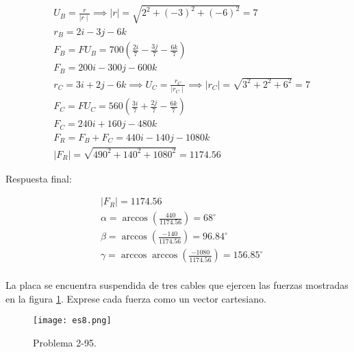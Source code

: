 \begin{align*}
	 & U_B=\frac{r}{\mid r\mid}\implies \mid r\mid=\sqrt{2^2+(-3)^2+(-6)^2}=7                        \\
	 & r_B=2i-3j-6k                                                                                  \\
	 & F_B=FU_B=700\left( \frac{2i}{7}-\frac{3j}{7}-\frac{6k}{7} \right)                             \\
	 & F_B=200i-300j-600k                                                                            \\
	 & r_C=3i+2j-6k\implies U_C=\frac{r_C}{\mid r_C \mid}\implies \mid r_C \mid=\sqrt{3^2+2^2+6^2}=7 \\
	 & F_C=FU_C=560\left( \frac{3i}{7}+\frac{2j}{7}-\frac{6k}{7} \right)                             \\
	 & F_C=240i+160j-480k                                                                            \\
	 & F_R=F_B+F_C=440i-140j-1080k                                                                   \\
	 & \mid F_R \mid=\sqrt{490^2+140^2+1080^2}=1174.56
\end{align*}

Respuesta final:

\begin{align*}
	 & \mid F_R \mid= 1174.56                                                      \\
	 & \alpha=\arccos \left( \frac{440}{1174.56} \right)=68^{\circ}                \\
	 & \beta=\arccos \left( \frac{-140}{1174.56} \right)=96.84^{\circ}             \\
	 & \gamma= \arccos \arccos \left( \frac{-1080}{1174.56} \right)=156.85^{\circ} \\
\end{align*}


\begin{problem}
La placa se encuentra suspendida de tres cables que ejercen las fuerzas mostradas en la figura \ref{es8pdf}. Exprese cada fuerza como un vector cartesiano.
\end{problem}

\begin{figure}[h!]
	\centering
	\texttt{[image: es8.png]}
	\caption{Problema 2-95.}
	\label{es8pdf}
\end{figure}


